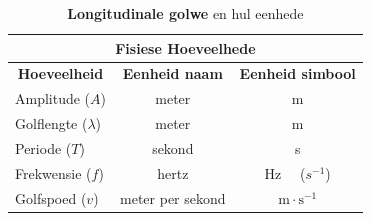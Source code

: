 \begin{table}[H]
\begin{center}
\begin{tabular}{|l|c|c|}\hline \hline 
\multicolumn{3}{|c|}{\textbf{Fisiese Hoeveelhede}}\\ \hline \hline
\multicolumn{1}{|c|}{\textbf{Hoeveelheid}} & \textbf{Eenheid naam} & \textbf{Eenheid simbool}\\ \hline
Amplitude ($A$) & meter & m \\ \hline
Golflengte ($\lambda$) & meter & m \\ \hline
Periode ($T$) & sekond & s \\ \hline
Frekwensie ($f$) & hertz & Hz \ \ ($s^{-1}$) \\ \hline
Golfspoed ($v$)& meter per sekond & $\text{m} \cdot \text{s}^{-1}$ \\ \hline
\end{tabular}
\end{center}
\caption{\textbf{Longitudinale golwe} en hul eenhede}
\label{table:electrostatics::units}
\end{table}
   \label{m38783*cid9}


